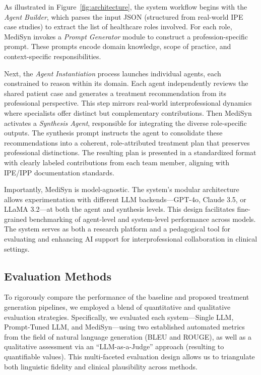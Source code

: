 \documentclass[pdflatex,sn-mathphys-num]{sn-jnl}%
\theoremstyle{thmstyleone}%
\theoremstyle{thmstyletwo}%
\theoremstyle{thmstylethree}%
\begin{document}
As illustrated in Figure~\ref{fig:architecture}, the system workflow begins with the \textit{Agent Builder}, which parses the input JSON (structured from real-world IPE case studies) to extract the list of healthcare roles involved. For each role, MediSyn invokes a \textit{Prompt Generator} module to construct a profession-specific prompt. These prompts encode domain knowledge, scope of practice, and context-specific responsibilities.

Next, the \textit{Agent Instantiation} process launches individual agents, each constrained to reason within its domain. Each agent independently reviews the shared patient case and generates a treatment recommendation from its professional perspective. This step mirrors real-world interprofessional dynamics where specialists offer distinct but complementary contributions. Then MediSyn activates a \textit{Synthesis Agent}, responsible for integrating the diverse role-specific outputs. The synthesis prompt instructs the agent to consolidate these recommendations into a coherent, role-attributed treatment plan that preserves professional distinctions. The resulting plan is presented in a standardized format with clearly labeled contributions from each team member, aligning with IPE/IPP documentation standards.

Importantly, MediSyn is model-agnostic. The system’s modular architecture allows experimentation with different LLM backends—GPT-4o, Claude 3.5, or LLaMA 3.2—at both the agent and synthesis levels. This design facilitates fine-grained benchmarking of agent-level and system-level performance across models. The system serves as both a research platform and a pedagogical tool for evaluating and enhancing AI support for interprofessional collaboration in clinical settings.

\subsection{Evaluation Methods}\label{subsec3.6}

To rigorously compare the performance of the baseline and proposed treatment generation pipelines, we employed a blend of quantitative and qualitative evaluation strategies. Specifically, we evaluated each system—Single LLM, Prompt-Tuned LLM, and MediSyn—using two established automated metrics from the field of natural language generation (BLEU and ROUGE), as well as a qualitative assessment via an ``LLM-as-a-Judge'' approach (resulting to quantifiable values). This multi-faceted evaluation design allows us to triangulate both linguistic fidelity and clinical plausibility across methods.
\end{document}
